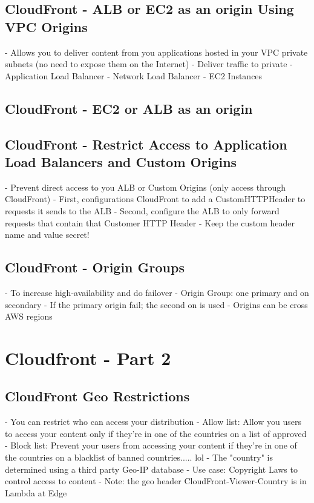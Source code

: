 \documentclass[11pt]{book}
\begin{document}
    \subsection{CloudFront - ALB or EC2 as an origin Using VPC Origins}
    - Allows you to deliver content from you applications hosted in your VPC private subnets (no need to expose them on the Internet)
    - Deliver traffic to private
    - Application Load Balancer
    - Network Load Balancer
    - EC2 Instances


    \subsection{CloudFront - EC2 or ALB as an origin}

    \subsection{CloudFront - Restrict Access to Application Load Balancers and Custom Origins}
    - Prevent direct access to you ALB or Custom Origins (only access through CloudFront)
    - First, configurations CloudFront to add a CustomHTTPHeader to requests it sends to the ALB
    - Second, configure the ALB to only forward requests that contain that Customer HTTP Header
    - Keep the custom header name and value secret!


    \subsection{CloudFront - Origin Groups}
    - To increase high-availability and do failover
    - Origin Group: one primary and on secondary
    - If the primary origin fail; the second on is used
    - Origins can be cross AWS regions



    \section{Cloudfront - Part 2}

    \subsection{CloudFront Geo Restrictions}
    - You can restrict who can access your distribution
    - Allow list: Allow you users to access your content only if they're in one of the countries on a list of approved
    - Block list: Prevent your users from accessing your content if they're in one of the countries on a blacklist of banned countries..... lol
    - The "country" is determined using a third party Geo-IP database
    - Use case: Copyright Laws to control access to content
    - Note: the geo header CloudFront-Viewer-Country is in Lambda at Edge
\end{document}
